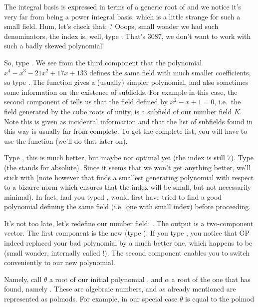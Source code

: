 The integral basis is expressed in terms of a generic root  of 
and we notice it's very far from being a power integral basis, which is a
little strange for such a small field. Hum, let's check that: ?
Ooops, small wonder we had such denominators, the index is, well, type
. That's $3087$, we don't want to work with such
a badly skewed polynomial!

  So, type . We see from the third component that the
polynomial $x^4-x^3-21x^2+17x+133$ defines the same field with much smaller
coefficients, so type . The  function gives a
(usually) simpler polynomial, and also sometimes some information on the
existence of subfields. For example in this case, the second component of
 tells us that the field defined by $x^2-x+1=0$, i.e.~the field
generated by the cube roots of unity, is a subfield of our number field $K$.
Note this is given as incidental information and that the list of subfields
found in this way is usually far from complete. To get the complete list, you
will have to use the function  (we'll do that later on).

  Type , this is much better, but maybe not optimal yet
(the index is still $7$). Type  (the  stands for
absolute). Since it seems that we won't get anything better, we'll stick with
 (note however that  finds a smallest generating
polynomial with respect to a bizarre norm which ensures that the index will
be small, but not necessarily minimal). In fact, had you typed
,  would first have tried to find a good
polynomial defining the same field (i.e.~one with small index) before
proceeding.

  It's not too late, let's redefine our number field: .
The output is a two-component vector. The first component is the new
 (type ). If you type , you notice that GP
indeed replaced your bad polynomial  by a much better one, which
happens to be  (small wonder,  internally called
!). The second component enables you to switch conveniently to
our new polynomial.

Namely, call $\theta$ a root of our initial polynomial , and $\alpha$
a root of the one that  has found, namely . These are
algebraic numbers, and as already mentioned are represented as polmods. For
example, in our special case $\theta$ is equal to the polmod

